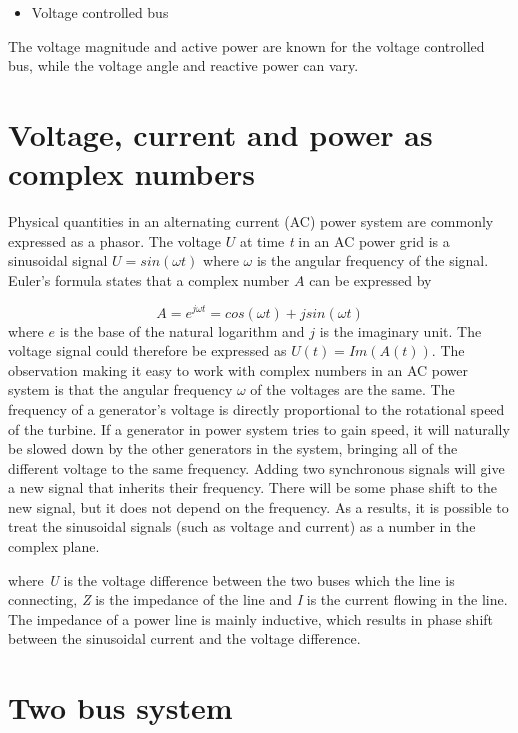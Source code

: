 \documentclass{report}
\begin{document}
\begin{itemize}
  \item Voltage controlled bus
\end{itemize}
The voltage magnitude and active power are known for the voltage controlled bus, while the voltage angle and reactive power can vary.

\section{Voltage, current and power as complex numbers}
Physical quantities in an alternating current (AC) power system are commonly expressed as a phasor. The voltage $U$ at time \textit{t} in an AC power grid is a sinusoidal signal $U = sin(\omega t)$ where $\omega$ is the angular frequency of the signal. Euler's formula states that a complex number $A$ can be expressed by

\begin{equation}\label{eq:eulers_equation}
    A = e^{j\omega t} = cos(\omega t) + jsin(\omega t)
\end{equation}
where $e$ is the base of the natural logarithm and $j$ is the imaginary unit. The voltage signal could therefore be expressed as $U(t) = Im(A(t))$. The observation making it easy to work with complex numbers in an AC power system is that the angular frequency $\omega$ of the voltages are the same. The frequency of a generator's voltage is directly proportional to the rotational speed of the turbine. If a generator in power system tries to gain speed, it will naturally be slowed down by the other generators in the system, bringing all of the different voltage to the same frequency. Adding two synchronous signals will give a new signal that inherits their frequency. There will be some phase shift to the new signal, but it does not depend on the frequency. As a results, it is possible to treat the sinusoidal signals (such as voltage and current) as a number in the complex plane.  

where \textit{U} is the voltage difference between the two buses which the line is connecting, \textit{Z} is the impedance of the line and \textit{I} is the current flowing in the line. The impedance of a power line is mainly inductive, which results in phase shift between the sinusoidal  current and the voltage difference. 

\section{Two bus system}
\end{document}
